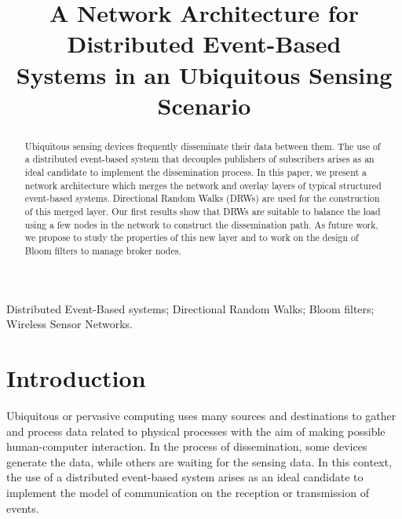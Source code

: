 \documentclass[conference]{IEEEtran}
\begin{document}

\title{A Network Architecture for Distributed Event-Based \\Systems in an Ubiquitous Sensing Scenario}
\author{
}

\maketitle


\begin{abstract}
Ubiquitous sensing devices frequently disseminate their data between them. The use of a distributed event-based system that decouples publishers of subscribers arises as an ideal candidate to implement the dissemination process. In this paper, we present a network architecture which merges the network and overlay layers of typical structured event-based systems. Directional Random Walks (DRWs) are used for the construction of this merged layer. Our first results show that DRWs are suitable to balance the load using a few nodes in the network to construct the dissemination path. As future work, we propose to study the properties of this new layer and to work on the design of Bloom filters to manage broker nodes. 
\end{abstract}

\vspace{1em}
\begin{IEEEkeywords}
Distributed Event-Based systems; Directional Random Walks; Bloom filters; Wireless Sensor Networks.
\end{IEEEkeywords}

\section{Introduction}
\label{sec:introduction}

Ubiquitous or pervasive computing \cite{Cook:2012:RPC:2109687.2109848} uses many sources and destinations to gather and process data related to physical processes with the aim of making possible human-computer interaction. In the process of dissemination, some devices generate the data, while others are waiting for the sensing data. In this context, the use of a distributed event-based system \cite{Muhl:2006:DES:1162246} arises as an ideal candidate to implement the model of communication on the reception or transmission of events. 
\end{document}
